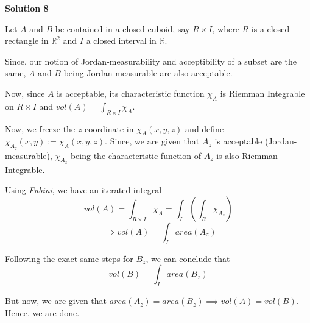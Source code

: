 \documentclass[12pt,a4paper]{article}
\theoremstyle{definition}
\begin{document}
\begin{flushleft}
\bigskip

{\bf Solution 8}

\medskip

Let $A$ and $B$ be contained in a closed cuboid, say $R \times I$, where $R$ is a closed rectangle in $\mathbb{R}^2$ and $I$ a closed interval in $\mathbb{R}$. 

Since, our notion of Jordan-measurability and acceptibility of a subset are the same, $A$ and $B$ being Jordan-measurable are also acceptable.

\medskip

Now, since $A$ is acceptable, its characteristic function $\chi_A$ is Riemman Integrable on $R \times I$ and $vol(A) = \int_{R \times I} \chi_A$.

Now, we freeze the $z$ coordinate in $\chi_A (x,y,z)$ and define $\chi_{A_z} (x,y) := \chi_A (x,y,z)$. Since, we are given that $A_z$ is acceptable (Jordan-measurable), $\chi_{A_z}$ being the characteristic function of $A_z$ is also Riemman Integrable.

Using {\it Fubini}, we have an iterated integral-
$$vol(A) = \int_{R \times I} \chi_A = \int_{I} (\int_{R} \chi_{A_z})$$
$$\implies vol(A) = \int_{I} area(A_z)$$

Following the exact same steps for $B_z$, we can conclude that-
$$vol(B) = \int_{I} area(B_z)$$

But now, we are given that $area(A_z)= area(B_z) \implies vol(A) = vol(B)$. Hence, we are done.

\end{flushleft}
\end{document}
